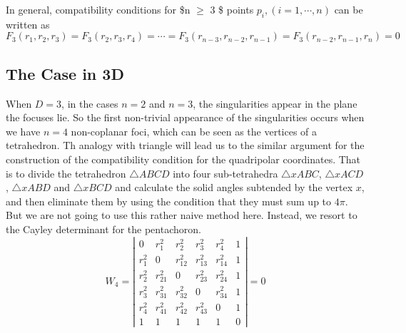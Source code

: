 \documentclass{article}
\begin{document}
In general, compatibility conditions for \$n $\ge$ 3 \$ points $p_i, (i=1,\cdots,n)$ can be written as
\begin{equation}
\label{}
F_3(r_1,r_2,r_3) =  F_3(r_2,r_3,r_4) = \cdots = F_3(r_{n-3},r_{n-2},r_{n-1})= F_3(r_{n-2},r_{n-1},r_{n})=0
\end{equation}

\subsection{The Case in 3D}
\label{sec-1-5}
 When $D=3$, in the cases $n=2$ and $n=3$, the singularities appear in the plane the focuses lie. 
So the first non-trivial appearance of the singularities occurs when we have $n=4$ non-coplanar foci, which can be seen as the vertices of a tetrahedron. 
Th analogy with triangle will lead us to the similar argument for the construction of the compatibility condition for the quadripolar coordinates. 
That is to divide the tetrahedron $\triangle ABCD$ into four sub-tetrahedra $\triangle xABC$, $\triangle xACD$, $\triangle xABD$ and $\triangle xBCD$ and calculate the solid angles subtended by the vertex $x$, and then eliminate them by using the condition that they must sum up to $4\pi$. 
But we are not going to use this rather naive method here. Instead, we resort to the Cayley determinant for the pentachoron.
\begin{equation}
\label{eq:vol_det}
W_4=
\left|\begin{array}{cccccc}
0 & r_{1}^2 & r_{2}^2 & r_{3}^2 & r_{4}^2 & 1 \\
r_{1}^2 & 0 & r_{12}^2 & r_{13}^2 & r_{14}^2 & 1 \\
r_{2}^2 & r_{21}^2 & 0 & r_{23}^2 & r_{24}^2 & 1 \\
r_{3}^2 & r_{31}^2 & r_{32}^2 & 0 & r_{34}^2 & 1 \\
r_{4}^2 & r_{41}^2 & r_{42}^2 & r_{43}^2 & 0 & 1 \\
1 & 1 & 1 & 1 & 1 & 0  
\end{array}\right|
=0
\end{equation}
\end{document}
